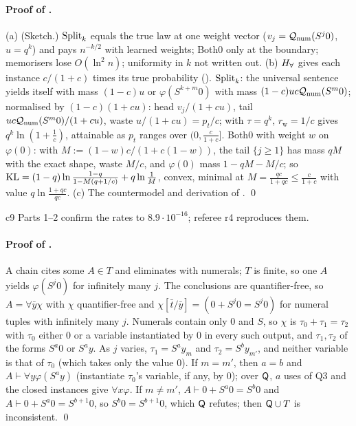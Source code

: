 \paragraph{Proof of .} (a) (Sketch.) $\mathrm{Split}_k$ equals the true law at one weight vector ($v_j=\mathcal{Q}_{\mathrm{num}}(S^j0)$, $u=q^k$) and pays $n^{-k/2}$ with learned weights; Both0 only at the boundary; memorisers lose $O(\ln^2n)$; uniformity in $k$ not written out. (b) $H_{\forall}$ gives each instance $c/(1+c)$ times its true probability (). $\mathrm{Split}_k$: the universal sentence yields itself with mass $(1-c)u$ or $\varphi(S^{k+m}0)$ with mass $(1-c)uc\mathcal{Q}_{\mathrm{num}}(S^m0)$; normalised by $(1-c)(1+cu)$: head $v_j/(1+cu)$, tail $uc\mathcal{Q}_{\mathrm{num}}(S^m0)/(1+cu)$, waste $u/(1+cu)=p_t/c$;  with $\tau=q^k$, $r_{\mathrm w}=1/c$ gives $q^k\ln(1+\frac1c)$, attainable as $p_t$ ranges over $(0,\frac c{1+c}]$. Both0 with weight $w$ on $\varphi(0)$: with $M:=(1-w)c/(1+c(1-w))$, the tail $\{j\ge1\}$ has mass $qM$ with the exact shape, waste $M/c$, and $\varphi(0)$ mass $1-qM-M/c$; so $\mathrm{KL}=(1-q)\ln\frac{1-q}{1-M(q+1/c)}+q\ln\frac1M$, convex, minimal at $M=\frac{qc}{1+qc}\le\frac c{1+c}$ with value $q\ln\frac{1+qc}{qc}$. (c) The countermodel and derivation of . \qed

c9 Parts 1--2 confirm the rates to $8.9\cdot10^{-16}$; referee r4 reproduces them.

\paragraph{Proof of .} A chain cites some $A\in T$ and eliminates with numerals; $T$ is finite, so one $A$ yields $\varphi(S^j0)$ for infinitely many $j$. The conclusions are quantifier-free, so $A=\forall\bar y\chi$ with $\chi$ quantifier-free and $\chi[\bar t/\bar y]=(0+S^j0=S^j0)$ for numeral tuples with infinitely many $j$. Numerals contain only $0$ and $S$, so $\chi$ is $\tau_0+\tau_1=\tau_2$ with $\tau_0$ either $0$ or a variable instantiated by $0$ in every such output, and $\tau_1,\tau_2$ of the forms $S^a0$ or $S^ay$. As $j$ varies, $\tau_1=S^ay_m$ and $\tau_2=S^by_{m'}$, and neither variable is that of $\tau_0$ (which takes only the value $0$). If $m=m'$, then $a=b$ and $A\vdash\forall y\varphi(S^ay)$ (instantiate $\tau_0$'s variable, if any, by $0$); over $\mathsf{Q}$, $a$ uses of Q3 and the closed instances give $\forall x\varphi$. If $m\neq m'$, $A\vdash0+S^a0=S^b0$ and $A\vdash0+S^a0=S^{b+1}0$, so $S^b0=S^{b+1}0$, which $\mathsf{Q}$ refutes; then $\mathsf{Q}\cup T$ is inconsistent. \qed

